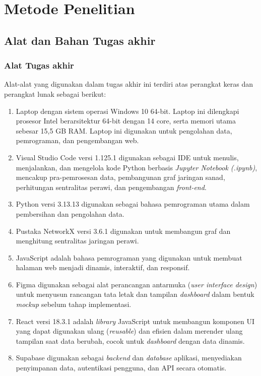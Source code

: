 ﻿\chapter{Metode Penelitian}

\section{Alat dan Bahan Tugas akhir}

\subsection{Alat Tugas akhir}

Alat-alat yang digunakan dalam tugas akhir ini terdiri atas perangkat keras dan perangkat lunak sebagai berikut:

\begin{enumerate}
	\item Laptop dengan sistem operasi Windows 10 64-bit. Laptop ini dilengkapi prosesor Intel berarsitektur 64-bit dengan 14 core, serta memori utama sebesar 15,5 GB RAM.
	Laptop ini digunakan untuk pengolahan data, pemrograman, dan pengembangan web.
	\item Visual Studio Code versi 1.125.1 digunakan sebagai IDE untuk menulis, menjalankan, dan mengelola kode Python berbasis \textit{Jupyter Notebook (.ipynb)}, mencakup pra-pemrosesan data, pembangunan graf jaringan sanad, perhitungan sentralitas perawi, dan pengembangan \textit{front-end}.
	\item Python versi 3.13.13 digunakan sebagai bahasa pemrograman utama dalam pembersihan dan pengolahan data.
	\item Pustaka NetworkX versi 3.6.1 digunakan untuk membangun graf dan menghitung sentralitas jaringan perawi.
	\item JavaScript adalah bahasa pemrograman yang digunakan untuk membuat halaman web menjadi dinamis, interaktif, dan responsif.
	\item Figma digunakan sebagai alat perancangan antarmuka (\textit{user interface design}) untuk menyusun rancangan tata letak dan tampilan \textit{dashboard} dalam bentuk \textit{mockup} sebelum tahap implementasi.
	\item React versi 18.3.1 adalah \textit{library} JavaScript untuk membangun komponen UI yang dapat digunakan ulang (\textit{reusable}) dan efisien dalam merender ulang tampilan saat data berubah, cocok untuk \textit{dashboard} dengan data dinamis.
	\item Supabase digunakan sebagai \textit{backend} dan \textit{database} aplikasi, menyediakan penyimpanan data, autentikasi pengguna, dan API secara otomatis.
\end{enumerate}


